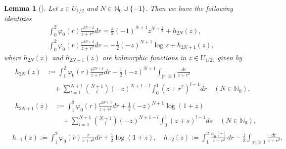 \documentclass[dvipdfmx,12pt]{article}
\newtheorem{lem}[dfn]{Lemma}
\begin{document}
\begin{lem}[\cite{SE18}]\label{R-R3-lem6}
Let $z\in \Dot{U}_{1/2}$ and $N\in\mathbb{N}_0\cup \{-1\}$. Then we have the following identities 
\begin{align*}
&\int_0^2 \varphi_0(r)\frac{r^{2N+2}}{z+r^2}dr= \frac{\pi}{2}(-1)^{N+1}z^{N+\frac{1}{2}}+ h_{2N}(z), \\
&\int_0^2 \varphi_0(r)\frac{r^{2N+3}}{z+r^2}dr= -\frac{1}{2}(-z)^{N+1}\log z+ h_{2N+1}(z), 
\end{align*}
where $h_{2N}(z)$ and $h_{2N+1}(z)$ are holmorphic functions in $z\in U_{1/2}$, given by
\begin{align*}
&
\begin{aligned}
h_{2N}(z)&:=\int_1^2 \varphi_0(r)\frac{r^{2N+2}}{z+r^2}dr-\frac{1}{2}(-z)^{N+1}\int_{|r|\ge1}\frac{dr}{z+r^2} \\
&\quad +\sum_{l=1}^{N+1} \binom{N+1}{l} (-z)^{N+1-l}\int_0^1(z+r^2)^{l-1}dr \quad (N\in \mathbb{N}_0), 
\end{aligned}
\\
&
\begin{aligned}
h_{2N+1}(z)&:=\int_1^2 \varphi_0(r)\frac{r^{2N+3}}{z+r^2}dr +\frac{1}{2}(-z)^{N+1}\log(1+z)\\
&\quad+\sum_{l=1}^{N+1}\binom{N+1}{l}(-z)^{N+1-l}\int_0^1(z+s)^{l-1}ds \quad (N\in \mathbb{N}_0),
\end{aligned}
\\
&h_{-1}(z):=\int_1^2 \varphi_0(r)\frac{r}{z+r^2}dr+\frac{1}{2}\log(1+z), 
\quad h_{-2}(z):=\int_1^2 \frac{\varphi_0(r)}{z+r^2}dr-\frac{1}{2}\int_{|r|\ge1}\frac{dr}{z+r^2}.
\end{align*}
\end{lem}
\end{document}

